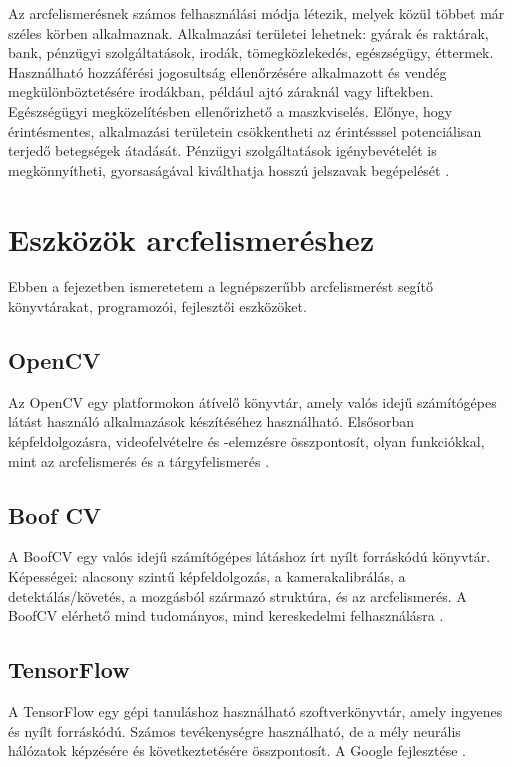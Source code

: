 Az arcfelismerésnek számos felhasználási módja létezik, melyek közül többet már széles körben alkalmaznak. Alkalmazási területei lehetnek: gyárak és raktárak, bank, pénzügyi szolgáltatások, irodák, tömegközlekedés, egészségügy, éttermek. Használható hozzáférési jogosultság ellenőrzésére alkalmazott és vendég megkülönböztetésére irodákban, például ajtó záraknál vagy liftekben. Egészségügyi megközelítésben ellenőrizhető a maszkviselés. Előnye, hogy érintésmentes, alkalmazási területein csökkentheti az érintésssel potenciálisan terjedő betegségek átadását. Pénzügyi szolgáltatások igénybevételét is megkönnyítheti, gyorsaságával kiválthatja hosszú jelszavak begépelését \cite{artc09}.

\section{Eszközök arcfelismeréshez}
Ebben a fejezetben ismeretetem a legnépszerűbb arcfelismerést segítő könyvtárakat, programozói, fejlesztői eszközöket.
\subsection{OpenCV}
Az OpenCV egy platformokon átívelő könyvtár, amely valós idejű számítógépes látást használó alkalmazások készítéséhez használható. Elsősorban képfeldolgozásra, videofelvételre és -elemzésre összpontosít, olyan funkciókkal, mint az arcfelismerés és a tárgyfelismerés \cite{artc06}.

\subsection{Boof CV}
A BoofCV egy valós idejű számítógépes látáshoz írt nyílt forráskódú könyvtár. Képességei: alacsony szintű képfeldolgozás, a kamerakalibrálás, a detektálás/követés, a mozgásból származó struktúra, és az arcfelismerés. A BoofCV elérhető mind tudományos, mind kereskedelmi felhasználásra \cite{artc06}.

\subsection{TensorFlow}
A TensorFlow egy gépi tanuláshoz használható szoftverkönyvtár, amely ingyenes és nyílt forráskódú. Számos tevékenységre használható, de a mély neurális hálózatok képzésére és következtetésére összpontosít. A Google fejlesztése \cite{artc06}.


